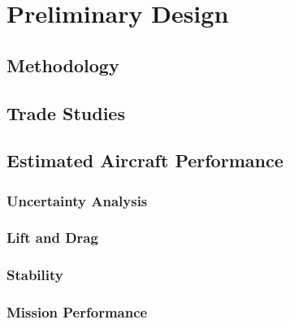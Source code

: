 \documentclass[report]{byu-aero}
\begin{document}
\section{Preliminary Design} %
\label{sec:PreliminaryDesign}


\subsection{Methodology}
\label{ssec:methodology}




\subsection{Trade Studies}
\label{ssec:tradestudies}




\subsection{Estimated Aircraft Performance}
\label{ssec:estaircraftperfomance}




\subsubsection{Uncertainty Analysis}
\label{sssec:uncertaintyanalysis}




\subsubsection{Lift and Drag}
\label{sssec:liftdrag}




\subsubsection{Stability}
\label{sssec:stability}



\subsubsection{Mission Performance}
\label{sssec:missionperformance}
\end{document}
